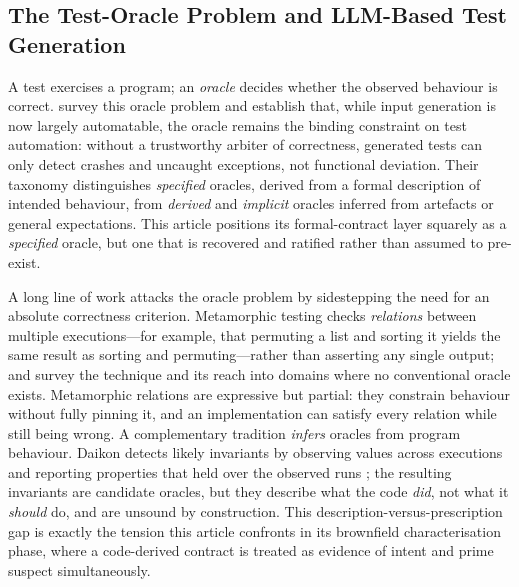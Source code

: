 \subsection{The Test-Oracle Problem and LLM-Based Test Generation}
\label{subsec:rw6}

A test exercises a program; an \emph{oracle} decides whether the observed
behaviour is correct. \citet{barr2015oracle} survey this oracle problem and
establish that, while input generation is now largely automatable, the oracle
remains the binding constraint on test automation: without a trustworthy
arbiter of correctness, generated tests can only detect crashes and uncaught
exceptions, not functional deviation. Their taxonomy distinguishes
\emph{specified} oracles, derived from a formal description of intended
behaviour, from \emph{derived} and \emph{implicit} oracles inferred from
artefacts or general expectations. This article positions its formal-contract
layer squarely as a \emph{specified} oracle, but one that is recovered and
ratified rather than assumed to pre-exist.

A long line of work attacks the oracle problem by sidestepping the need for an
absolute correctness criterion. Metamorphic testing checks
\emph{relations} between multiple executions---for example, that permuting a
list and sorting it yields the same result as sorting and permuting---rather
than asserting any single output; \citet{chen2018metamorphic} and
\citet{segura2016metamorphic} survey the technique and its reach into
domains where no conventional oracle exists. Metamorphic relations are
expressive but partial: they constrain behaviour without fully pinning it,
and an implementation can satisfy every relation while still being wrong. A
complementary tradition \emph{infers} oracles from program behaviour. Daikon
detects likely invariants by observing values across executions and reporting
properties that held over the observed runs \citep{ernst2007daikon}; the
resulting invariants are candidate oracles, but they describe what the code
\emph{did}, not what it \emph{should} do, and are unsound by construction. This
description-versus-prescription gap is exactly the tension this article
confronts in its brownfield characterisation phase, where a code-derived
contract is treated as evidence of intent and prime suspect simultaneously.

